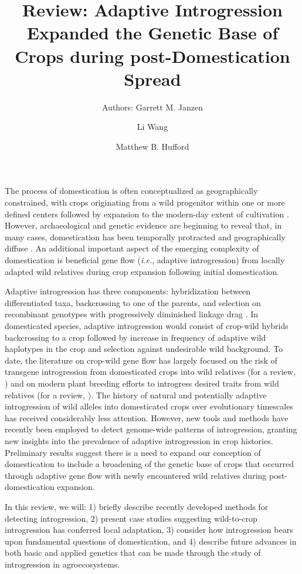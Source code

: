 \documentclass[11pt]{article}
\title{Review: Adaptive Introgression Expanded the Genetic Base of Crops during post-Domestication Spread}
\author[1]{Authors: Garrett M. Janzen}%
\author[1]{Li Wang}
\author[1,*]{Matthew B. Hufford}
\affil[1]{Department of Ecology, Evolution, and Organismal Biology, Iowa State University, Ames, Iowa, USA}
\affil[*]{Correspondence: mhufford@iastate.edu (M.B. Hufford)}
\date{}
\begin{document}
\maketitle


The process of domestication is often conceptualized as geographically constrained, with crops originating from a wild progenitor within one or more defined centers followed by expansion to the modern-day extent of cultivation \cite{Harlan1992}.
However, archaeological and genetic evidence are beginning to reveal that, in many cases, domestication has been temporally protracted and geographically diffuse \cite{brown2009complex, Meyer2016, wang2017, zhou2017, Fuller2014}.
An additional important aspect of the emerging complexity of domestication is beneficial gene flow (\emph{i.e.}, adaptive introgression) from locally adapted wild relatives during crop expansion following initial domestication.


Adaptive introgression has three components: hybridization between differentiated taxa, backcrossing to one of the parents, and selection on recombinant genotypes with progressively diminished linkage drag \cite{barton2001role, Feuillet200824}.
In domesticated species, adaptive introgression would consist of crop-wild hybrids backcrossing to a crop followed by increase in frequency of adaptive wild haplotypes in the crop and selection against undesirable wild background.
To date, the literature on crop-wild gene flow has largely focused on the risk of transgene introgression from domesticated crops into wild relatives (for a review, \cite{stewart2003transgene}) and on modern plant breeding efforts to introgress desired traits from wild relatives (for a review, \cite{Dempewolf2017}).
The history of natural and potentially adaptive introgression of wild alleles into domesticated crops over evolutionary timescales has received considerably less attention.
However, new tools and methods have recently been employed to detect genome-wide patterns of introgression, granting new insights into the prevalence of adaptive introgression in crop histories.
Preliminary results suggest there is a need to expand our conception of domestication to include a broadening of the genetic base of crops that occurred through adaptive gene flow with newly encountered wild relatives during post-domestication expansion.

In this review, we will: 1) briefly describe recently developed methods for detecting introgression, 2) present case studies suggesting wild-to-crop introgression has conferred local adaptation, 3) consider how introgression bears upon fundamental questions of domestication, and 4) describe future advances in both basic and applied genetics that can be made through the study of introgression in agroecosystems.
\end{document}
